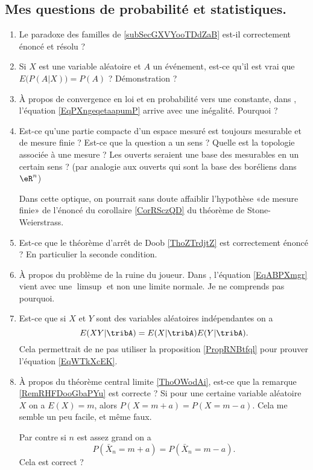 \subsection{Mes questions de probabilité et statistiques.}

\begin{enumerate}
    \item
        Le paradoxe des familles de \ref{subSecGXVYooTDdZaB} est-il correctement énoncé et résolu ? 
    \item
        Si \( X\) est une variable aléatoire et \( A\) un événement, est-ce qu'il est vrai que \( E\big( P(A|X) \big)=P(A)\) ? Démonstration ?
    \item
        À propos de convergence en loi et en probabilité vers une constante, dans \cite{CourgGudRennes}, l'équation \eqref{EqPXngeqetaapumP} arrive avec une inégalité. Pourquoi ?
    \item
        Est-ce qu'une partie compacte d'un espace mesuré est toujours mesurable et de mesure finie ? Est-ce que la question a un sens ? Quelle est la topologie associée à une mesure ? Les ouverts seraient une base des mesurables en un certain sens ?  (par analogie aux ouverts qui sont la base des boréliens dans \( \eR^n\))

        Dans cette optique, on pourrait sans doute affaiblir l'hypothèse «de mesure finie» de l'énoncé du corollaire \ref{CorRSczQD} du théorème de Stone-Weierstrass.
    \item
        Est-ce que le théorème d'arrêt de Doob \ref{ThoZTrdjtZ} est correctement énoncé ? En particulier la seconde condition. 
    \item
        À propos du problème de la ruine du joueur. Dans \cite{KXjFWKA}, l'équation \eqref{EqABPXmgr} vient avec une \( \limsup\) et non une limite normale. Je ne comprends pas pourquoi.
    \item
        Est-ce que si \( X\) et \( Y\) sont des variables aléatoires indépendantes on a
        \begin{equation}
            E(XY|\tribA)=E(X|\tribA)E(Y|\tribA).
        \end{equation}
        Cela permettrait de ne pas utiliser la proposition \ref{PropRNBtfql} pour prouver l'équation \eqref{EqWTkXcEK}.
    \item   \label{ItemIQDVooAcFUuH}
        À propos du théorème central limite \ref{ThoOWodAi}, est-ce que la remarque \ref{RemRHFDooGbaPYu} est correcte ? Si pour une certaine variable aléatoire \( X\) on a \( E(X)=m\), alors \( P(X=m+a)=P(X=m-a)\). Cela me semble un peu facile, et même faux.

        Par contre si \( n\) est assez grand on a
        \begin{equation}
            P(\bar X_n=m+a)=P(\bar X_n=m-a).
        \end{equation}
        Cela est correct ?
\end{enumerate}

